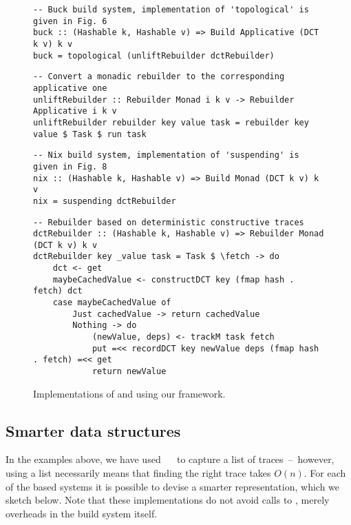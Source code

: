 \begin{figure}
\begin{verbatim}
-- Buck build system, implementation of 'topological' is given in Fig. 6
buck :: (Hashable k, Hashable v) => Build Applicative (DCT k v) k v
buck = topological (unliftRebuilder dctRebuilder)
\end{verbatim}
\vspace{1mm}
\begin{verbatim}
-- Convert a monadic rebuilder to the corresponding applicative one
unliftRebuilder :: Rebuilder Monad i k v -> Rebuilder Applicative i k v
unliftRebuilder rebuilder key value task = rebuilder key value $ Task $ run task
\end{verbatim}
\vspace{1mm}
\begin{verbatim}
-- Nix build system, implementation of 'suspending' is given in Fig. 8
nix :: (Hashable k, Hashable v) => Build Monad (DCT k v) k v
nix = suspending dctRebuilder
\end{verbatim}
\vspace{1mm}
\begin{verbatim}
-- Rebuilder based on deterministic constructive traces
dctRebuilder :: (Hashable k, Hashable v) => Rebuilder Monad (DCT k v) k v
dctRebuilder key _value task = Task $ \fetch -> do
    dct <- get
    maybeCachedValue <- constructDCT key (fmap hash . fetch) dct
    case maybeCachedValue of
        Just cachedValue -> return cachedValue
        Nothing -> do
            (newValue, deps) <- trackM task fetch
            put =<< recordDCT key newValue deps (fmap hash . fetch) =<< get
            return newValue
\end{verbatim}
\vspace{-2mm}
\caption{Implementations of \Buck and \Nix using our framework.}
\label{fig-buck-nix-implementation}
\vspace{-2mm}
\end{figure}

\vspace{-1mm}
\subsection{Smarter \hs{[Trace]} data structures}\label{sec-smart-traces}
\vspace{-1mm}

In the examples above, we have used \hs{[Trace}~~\hs{v]} to capture a list
of traces~--~however, using a list necessarily means that finding the right trace
takes $O(n)$. For each of the  based systems it is possible to devise
a smarter representation, which we sketch below. Note that these implementations
do not avoid calls to , merely overheads in the build system itself.

